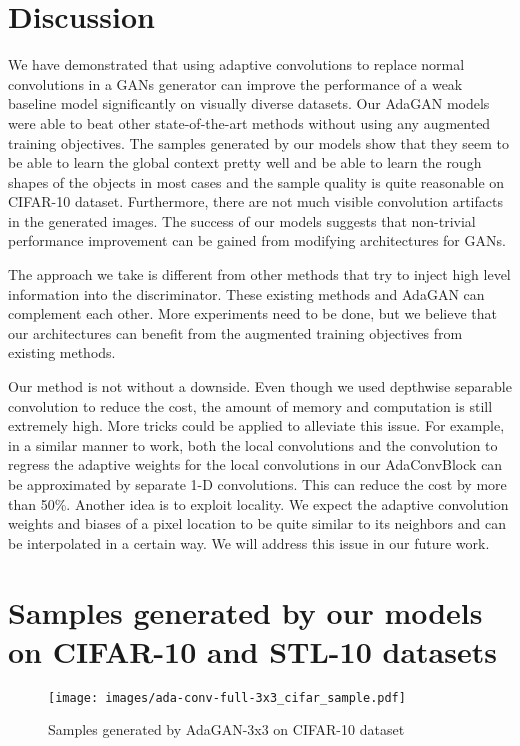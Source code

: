 \documentclass{article} %
\begin{document}
\section{Discussion}
We have demonstrated that using adaptive convolutions to replace normal convolutions in a GANs generator can improve the performance of a weak baseline model significantly on visually diverse datasets. Our AdaGAN models were able to beat other state-of-the-art methods without using any augmented training objectives. The samples generated by our models show that they seem to be able to learn the global context pretty well and be able to learn the rough shapes of the objects in most cases and the sample quality is quite reasonable on CIFAR-10 dataset. Furthermore, there are not much visible convolution artifacts in the generated images. The success of our models suggests that non-trivial performance improvement can be gained from modifying architectures for GANs. \par
The approach we take is different from other methods that try to inject high level information into the discriminator. These existing methods and AdaGAN can complement each other. More experiments need to be done, but we believe that our architectures can benefit from the augmented training objectives from existing methods. \par
Our method is not without a downside. Even though we used depthwise separable convolution to reduce the cost, the amount of memory and computation is still extremely high. More tricks could be applied to alleviate this issue. For example, in a similar manner to \cite{niklaus2017video} work, both the local convolutions and the convolution to regress the adaptive weights for the local convolutions in our AdaConvBlock can be approximated by separate 1-D convolutions. This can reduce the cost by more than 50\%. Another idea is to exploit locality. We expect the adaptive convolution weights and biases of a pixel location to be quite similar to its neighbors and can be interpolated in a certain way. We will address this issue in our future work. \par




\clearpage 
\appendix

\section{Samples generated by our models on CIFAR-10 and STL-10 datasets}
\label{appendix:samples}
\begin{figure}[h]
\begin{center}
\texttt{[image: images/ada-conv-full-3x3\_cifar\_sample.pdf]}
\end{center}
\caption{Samples generated by AdaGAN-3x3 on CIFAR-10 dataset}
\label{fig:ada-conv-full-3x3-cifar10}
\end{figure}
\end{document}

